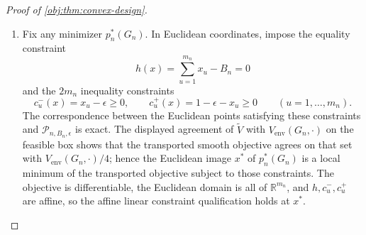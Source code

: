 \begin{proof}[Proof of \cref{obj:thm:convex-design}]
\begin{enumerate}
For a feasible \(p\), a coordinate \(k\), and a shared neighborhood \(S_{ij}\), differentiation along the \(k\)-th coordinate line gives
\[
\left.\frac{d}{dt}\right|_{t=0}
 \prod_{\ell\in S_{ij}}
 \bigl(p_\ell+\mathbf 1\{\ell=k\}t\bigr)^{-1}
=
\begin{cases}
-\left(\prod_{\ell\in S_{ij}}p_\ell^{-1}\right)p_k^{-1},
   &k\in S_{ij},\\
0,&k\notin S_{ij},
\end{cases}
\]
and
\[
\left.\frac{d}{dt}\right|_{t=0}
 \prod_{\ell\in S_{ij}}
 \bigl(1-p_\ell-\mathbf 1\{\ell=k\}t\bigr)^{-1}
=
\begin{cases}
\left(\prod_{\ell\in S_{ij}}(1-p_\ell)^{-1}\right)(1-p_k)^{-1},
   &k\in S_{ij},\\
0,&k\notin S_{ij}.
\end{cases}
\]
When \(k\notin S_{ij}\) the product does not depend on \(t\), and when \(k\in S_{ij}\) only the factor indexed by \(k\) varies, contributing \(\frac{d}{dt}(p_k+t)^{-1}|_{t=0}=-p_k^{-2}\) and \(\frac{d}{dt}(1-p_k-t)^{-1}|_{t=0}=(1-p_k)^{-2}\), respectively.  Subtracting the constant \(1\) leaves these derivatives unchanged, so the same formulas hold for the treated and control overlap loads, including the case \(S_{ij}=\varnothing\), where both derivatives vanish.  Summing over \((i,j)\) and multiplying by \((|O_n|)^{-1}\) gives exactly \cref{obj:def:kkt-gradient}:
\[
\left.\frac{d}{dt}\right|_{t=0}
\frac{V_{\mathrm{env}}\bigl(G_n,p+t e_k\bigr)}{4}
=g_k(G_n,p).
\]
Since \(\epsilon\le p_k\le1-\epsilon\), every \(|t|<\epsilon/2\) keeps \(p+te_k\) in the region where \(\widetilde V\) agrees with \(V_{\mathrm{env}}(G_n,\cdot)\).  Therefore the \(k\)-th Euclidean partial derivative of the transported objective at any feasible \(p\) is \(g_k(G_n,p)\).

\item Fix any minimizer \(p_n^*(G_n)\).  In Euclidean coordinates, impose the equality constraint
\[
h(x)=\sum_{u=1}^{m_n}x_u-B_n=0
\]
and the \(2m_n\) inequality constraints
\[
c_u^-(x)=x_u-\epsilon\ge0,
\qquad
c_u^+(x)=1-\epsilon-x_u\ge0
\qquad(u=1,\ldots,m_n).
\]
The correspondence between the Euclidean points satisfying these constraints and \(\mathcal P_{n,B_n,\epsilon}\) is exact.  The displayed agreement of \(\widetilde V\) with \(V_{\mathrm{env}}(G_n,\cdot)\) on the feasible box shows that the transported smooth objective agrees on that set with \(V_{\mathrm{env}}(G_n,\cdot)/4\); hence the Euclidean image \(x^*\) of \(p_n^*(G_n)\) is a local minimum of the transported objective subject to those constraints.  The objective is differentiable, the Euclidean domain is all of \(\mathbb R^{m_n}\), and \(h,c_u^-,c_u^+\) are affine, so the affine linear constraint qualification holds at \(x^*\).


\end{enumerate}
\end{proof}
